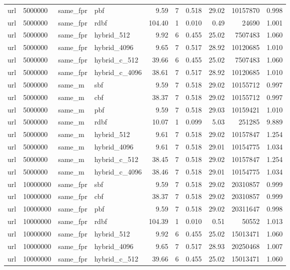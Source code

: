 \begin{tabular}{llllrrrrrr}
url & 5000000 & same\_fpr & pbf & 9.59 & 7 & 0.518 & 29.02 & 10157870 & 0.998 \\
url & 5000000 & same\_fpr & rdbf & 104.40 & 1 & 0.010 & 0.49 & 24690 & 1.001 \\
url & 5000000 & same\_fpr & hybrid\_512 & 9.92 & 6 & 0.455 & 25.02 & 7507483 & 1.060 \\
url & 5000000 & same\_fpr & hybrid\_4096 & 9.65 & 7 & 0.517 & 28.92 & 10120685 & 1.010 \\
url & 5000000 & same\_fpr & hybrid\_c\_512 & 39.66 & 6 & 0.455 & 25.02 & 7507483 & 1.060 \\
url & 5000000 & same\_fpr & hybrid\_c\_4096 & 38.61 & 7 & 0.517 & 28.92 & 10120685 & 1.010 \\
url & 5000000 & same\_m & sbf & 9.59 & 7 & 0.518 & 29.02 & 10155712 & 0.997 \\
url & 5000000 & same\_m & cbf & 38.37 & 7 & 0.518 & 29.02 & 10155712 & 0.997 \\
url & 5000000 & same\_m & pbf & 9.59 & 7 & 0.518 & 29.03 & 10159421 & 1.010 \\
url & 5000000 & same\_m & rdbf & 10.07 & 1 & 0.099 & 5.03 & 251285 & 9.889 \\
url & 5000000 & same\_m & hybrid\_512 & 9.61 & 7 & 0.518 & 29.02 & 10157847 & 1.254 \\
url & 5000000 & same\_m & hybrid\_4096 & 9.61 & 7 & 0.518 & 29.01 & 10154775 & 1.034 \\
url & 5000000 & same\_m & hybrid\_c\_512 & 38.45 & 7 & 0.518 & 29.02 & 10157847 & 1.254 \\
url & 5000000 & same\_m & hybrid\_c\_4096 & 38.46 & 7 & 0.518 & 29.01 & 10154775 & 1.034 \\
url & 10000000 & same\_fpr & sbf & 9.59 & 7 & 0.518 & 29.02 & 20310857 & 0.999 \\
url & 10000000 & same\_fpr & cbf & 38.37 & 7 & 0.518 & 29.02 & 20310857 & 0.999 \\
url & 10000000 & same\_fpr & pbf & 9.59 & 7 & 0.518 & 29.02 & 20311647 & 0.998 \\
url & 10000000 & same\_fpr & rdbf & 104.39 & 1 & 0.010 & 0.51 & 50552 & 1.013 \\
url & 10000000 & same\_fpr & hybrid\_512 & 9.92 & 6 & 0.455 & 25.02 & 15013471 & 1.060 \\
url & 10000000 & same\_fpr & hybrid\_4096 & 9.65 & 7 & 0.517 & 28.93 & 20250468 & 1.007 \\
url & 10000000 & same\_fpr & hybrid\_c\_512 & 39.66 & 6 & 0.455 & 25.02 & 15013471 & 1.060 \\

\end{tabular}
